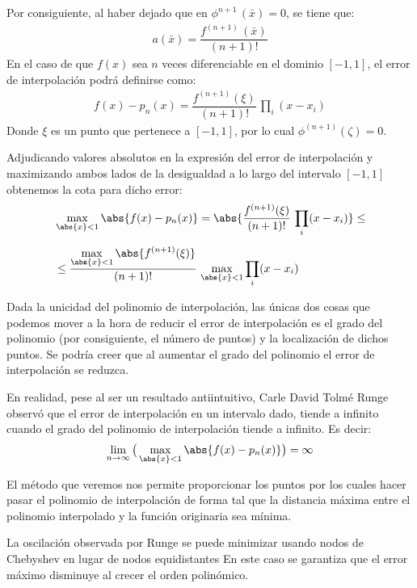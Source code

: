 Por consiguiente, al haber dejado que en $\phi^{n+1} \, (\bar{x}) = 0$, se tiene que:
\begin{align*}
a (\bar{x}) = \dfrac{f^{(n+1)} \, (\bar{x})}{(n + 1)!}
\end{align*}
En el caso de que $f(x)$ sea $n$ veces diferenciable en el dominio $[-1, 1]$, el error de interpolación podrá definirse como:
\begin{align*}
f(x) - p_{n}(x) = \dfrac{f^{(n+1)}(\xi)}{(n + 1)!} \, \prod_{i} (x - x_{i})
\end{align*}
Donde $\xi$ es un punto que pertenece a $[-1, 1]$, por lo cual $\phi^{(n+1)}(\zeta) = 0$.
\par
Adjudicando valores absolutos en la expresión del error de interpolación y maximizando ambos lados de la desigualdad a lo largo del intervalo $[-1, 1]$ obtenemos la cota para dicho error:
\begin{align*}
&\max_{\abs{x} < 1} \abs{f(x) - p_{n}(x)} = \abs{\dfrac{f^{(n+1)}(\xi)}{(n + 1)!} \, \prod_{i} (x - x_{i})} \leq \\[0.5em]
&\leq \dfrac{\displaystyle \max_{\abs{x} < 1} \abs{f^{(n+1)}(\xi)}}{(n+1)!} \, \max_{\abs{x} < 1} \prod_{i} (x - x_{i})
\end{align*}

Dada la unicidad del polinomio de interpolación, las únicas dos cosas que podemos mover a la hora de reducir el error de interpolación es el grado del polinomio (por consiguiente, el número de puntos) y la localización de dichos puntos. Se podría creer que al aumentar el grado del polinomio el error de interpolación se reduzca. 
\par
En realidad, pese al ser un resultado antiintuitivo, Carle David Tolmé Runge observó que el error de interpolación en un intervalo dado, tiende a infinito cuando el grado del polinomio de interpolación tiende a infinito. Es decir:
\begin{align*}
\lim_{n \to \infty} \big( \max_{\abs{x} < 1} \abs{f(x) - p_{n}(x)} \big) = \infty
\end{align*}

El método que veremos nos permite proporcionar los puntos por los cuales hacer pasar el polinomio de interpolación de forma tal que la distancia máxima entre el polinomio interpolado y la función originaria sea mínima.
\par
La oscilación observada por Runge se puede minimizar usando nodos de Chebyshev en lugar de nodos equidistantes En este caso se garantiza que el error máximo disminuye al crecer el orden polinómico.

